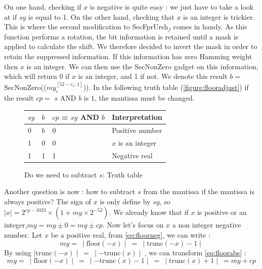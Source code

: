 \documentclass[runningheads]{llncs}
\begin{document}
    On one hand, checking if $x$ is negative is quite easy : we just have to take a look at if $sy$ is equal to 1.
    On the other hand, checking that $x$ is an integer is trickier. This is where the second modification to SecFprUrsh$_f$ comes in handy. As this function performs a rotation, the bit information is retained until a mask is applied to calculate the shift. 
    We therefore decided to invert the mask in order to retain the suppressed information. If this information has zero Hamming weight
    then $x$ is an integer. We can then use the SecNonZero gadget on this information, which will return $0$ if $x$ is an integer, and 1 if not.
    We denote this result $b=$ SecNonZero(($my_i^{[52 - c_x:1]}$)). 
    In the following truth table (\autoref{figure:flooradjust}) if the result $cp = $ $s$ AND $b$ is $1$, the mantissa must be changed.
    \begin{figure}
        \begin{center}
            \begin{tabular}{C{0.5cm} C{0.5cm} || C{3 cm} L{3cm}}
                \hline $sy$ & $b$ &$cp$ = $sy$ AND $b$ & Interpretation\\
                 & $b$ & 0 & Positive number\\
                1 & 0  & 0 & $x$ is an integer\\
                1 & 1  & 1 & Negative real\\ \hline
            \end{tabular}
        \end{center}
        \caption{Do we need to subtract $s$: Truth table}
        \label{figure:flooradjust}
    \end{figure}
    Another question is now : how to subtract $s$ from the mantissa if the mantissa is always positive? 
    The sign of $x$ is only define by $sy$, so $\mid x\mid = 2^{ey-1023}\times(1 + my\times 2^{-52})$.
    We already know that if $x$ is positive or an integer,$my = my \pm 0 = my \pm cp$.
    Now let's focus on $x$ a non integer negative number. Let $x$ be a positive real, from \autoref{eq:floorneg}, we can write :
    \begin{equation}\label{eq:floorabs}
        my =\: \mid \text{floor}(-x)\mid \:=\: \mid \text{trunc}(-x) - 1\mid
    \end{equation}
    By using $\mid \text{trunc}(-x) \mid \:=\: \mid -\text{trunc}(x)\mid \:$, we can transform \autoref{eq:floorabs} :
    \begin{equation}\label{eq:floorabs2}
        my =\: \mid \text{floor}(-x)\mid \:=\: \mid -\text{trunc}(x) - 1\mid \:=\: \mid \text{trunc}(x) + 1\mid \:= my + cp
    \end{equation}
\end{document}
